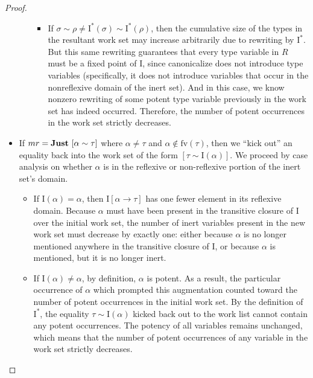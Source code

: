 \documentclass[10pt, letterpaper, oneside]{article}
\newcommand{\inertset}{\text{I}}
\newcommand{\fv}{\mathrm{fv}}
\begin{document}
\begin{proof}
\begin{itemize}
\begin{itemize}
\begin{itemize}
        \item If \(\sigma \sim \rho \ne \inertset^\ast(\sigma) \sim \inertset^\ast(\rho)\), then the cumulative size of the types in the resultant work set may increase arbitrarily due to rewriting by \(\inertset^\ast\). But this same rewriting guarantees that every type variable in \(R\) must be a fixed point of \(\inertset\), since canonicalize does not introduce type variables (specifically, it does not introduce variables that occur in the nonreflexive domain of the inert set). And in this case, we know nonzero rewriting of some potent type variable previously in the work set has indeed occurred. Therefore, the number of potent occurrences in the work set strictly decreases.

      \end{itemize}

    \end{itemize}

  \item If \(mr = \text{\bf Just}~[\alpha \sim \tau]\) where \(\alpha \ne \tau\) and \(\alpha \notin \fv(\tau)\), then we ``kick out'' an equality back into the work set of the form \([\tau \sim \inertset(\alpha)]\). We proceed by case analysis on whether \(\alpha\) is in the reflexive or non-reflexive portion of the inert set's domain.

    \begin{itemize}

      \item If \(\inertset(\alpha) = \alpha\), then \(\inertset[\alpha \to \tau]\) has one fewer element in its reflexive domain. Because \(\alpha\) must have been present in the transitive closure of \(\inertset\) over the initial work set, the number of inert variables present in the new work set must decrease by exactly one: either because \(\alpha\) is no longer mentioned anywhere in the transitive closure of \(\inertset\), or because \(\alpha\) is mentioned, but it is no longer inert.

      \item If \(\inertset(\alpha) \ne \alpha\), by definition, \(\alpha\) is potent. As a result, the particular occurrence of \(\alpha\) which prompted this augmentation counted toward the number of potent occurrences in the initial work set. By the definition of \(\inertset^\ast\), the equality \(\tau \sim \inertset(\alpha)\) kicked back out to the work list cannot contain any potent occurrences. The potency of all variables remains unchanged, which means that the number of potent occurrences of any variable in the work set strictly decreases.


\end{itemize}
\end{itemize}
\end{proof}
\end{document}
